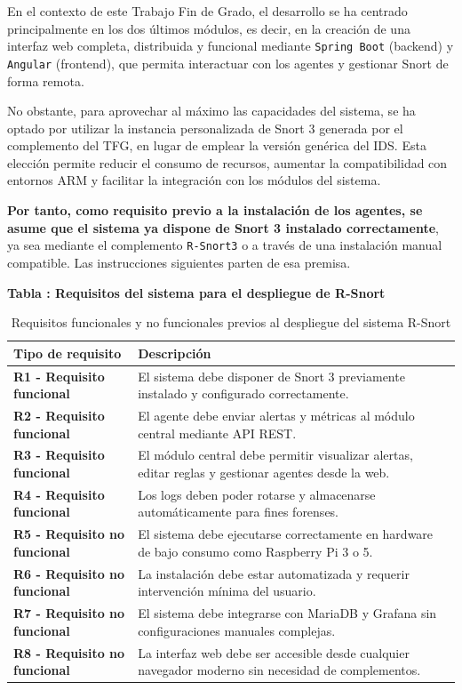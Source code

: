 \documentclass[11pt,a4paper,twoside]{report}
\begin{document}
En el contexto de este Trabajo Fin de Grado, el desarrollo se ha centrado principalmente en los dos últimos módulos, es decir, en la creación de una interfaz web completa, distribuida y funcional mediante \texttt{Spring Boot} (backend) y \texttt{Angular} (frontend), que permita interactuar con los agentes y gestionar Snort de forma remota.\newline

No obstante, para aprovechar al máximo las capacidades del sistema, se ha optado por utilizar la instancia personalizada de Snort 3 generada por el complemento del TFG, en lugar de emplear la versión genérica del IDS. Esta elección permite reducir el consumo de recursos, aumentar la compatibilidad con entornos ARM y facilitar la integración con los módulos del sistema.\newline

\textbf{Por tanto, como requisito previo a la instalación de los agentes, se asume que el sistema ya dispone de Snort 3 instalado correctamente}, ya sea mediante el complemento \texttt{R-Snort3} o a través de una instalación manual compatible. Las instrucciones siguientes parten de esa premisa.

\vspace{0.5cm}
\noindent \textbf{Tabla \thetable: Requisitos del sistema para el despliegue de R-Snort}
\begin{table}[H]
	\centering
	\begin{tabular}{|p{5.5cm}|p{8cm}|}
		\hline
		\rowcolor[HTML]{E0E0E0}
		\textbf{Tipo de requisito} & \textbf{Descripción} \\
		\hline
		\textbf{R1 - Requisito funcional} & El sistema debe disponer de Snort 3 previamente instalado y configurado correctamente. \\
		\hline
		\textbf{R2 - Requisito funcional} & El agente debe enviar alertas y métricas al módulo central mediante API REST. \\
		\hline
		\textbf{R3 - Requisito funcional} & El módulo central debe permitir visualizar alertas, editar reglas y gestionar agentes desde la web. \\
		\hline
		\textbf{R4 - Requisito funcional} & Los logs deben poder rotarse y almacenarse automáticamente para fines forenses. \\
		\hline
		\textbf{R5 - Requisito no funcional} & El sistema debe ejecutarse correctamente en hardware de bajo consumo como Raspberry Pi 3 o 5. \\
		\hline
		\textbf{R6 - Requisito no funcional} & La instalación debe estar automatizada y requerir intervención mínima del usuario. \\
		\hline
		\textbf{R7 - Requisito no funcional} & El sistema debe integrarse con MariaDB y Grafana sin configuraciones manuales complejas. \\
		\hline
		\textbf{R8 - Requisito no funcional} & La interfaz web debe ser accesible desde cualquier navegador moderno sin necesidad de complementos. \\
		\hline
	\end{tabular}
	\caption{Requisitos funcionales y no funcionales previos al despliegue del sistema R-Snort}
	\label{tab:requisitos-rsnort}
\end{table}
\end{document}
